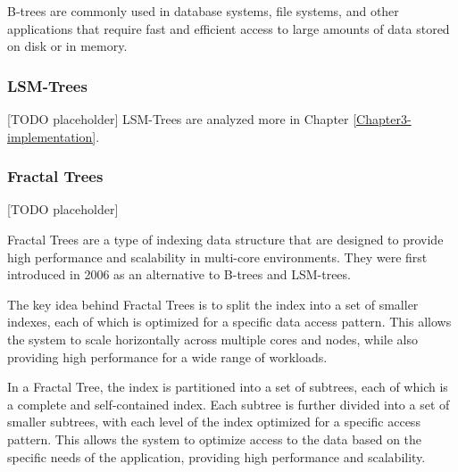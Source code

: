 B-trees are commonly used in database systems, file systems, and other applications that require fast and efficient access to large amounts of data stored on disk or in memory.

\subsubsection{LSM-Trees}

[TODO placeholder]
LSM-Trees are analyzed more in Chapter \ref{Chapter3-implementation}.

\subsubsection{Fractal Trees}

[TODO placeholder]

Fractal Trees are a type of indexing data structure that are designed to provide high performance and scalability in multi-core environments. They were first introduced in 2006 as an alternative to B-trees and LSM-trees.

The key idea behind Fractal Trees is to split the index into a set of smaller indexes, each of which is optimized for a specific data access pattern. This allows the system to scale horizontally across multiple cores and nodes, while also providing high performance for a wide range of workloads.

In a Fractal Tree, the index is partitioned into a set of subtrees, each of which is a complete and self-contained index. Each subtree is further divided into a set of smaller subtrees, with each level of the index optimized for a specific access pattern. This allows the system to optimize access to the data based on the specific needs of the application, providing high performance and scalability.



